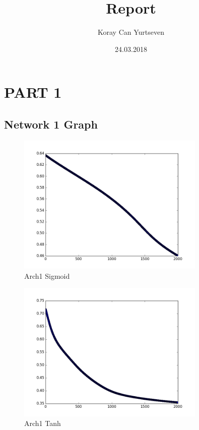 \documentclass{article}
\title{Report}
\author{Koray Can Yurtseven}
\date{24.03.2018}
\begin{document}
\maketitle

\section{PART 1}
\subsection{Network 1 Graph}
\begin{figure}[H]
  \caption{Arch1 Sigmoid}
  \centering
  \includegraphics[width=0.8\textwidth]{arch1sigmoid}
\end{figure}
\begin{figure}[H]
  \caption{Arch1 Tanh}
  \centering
  \includegraphics[width=0.8\textwidth]{arch1tanh}
\end{figure}
\end{document}

